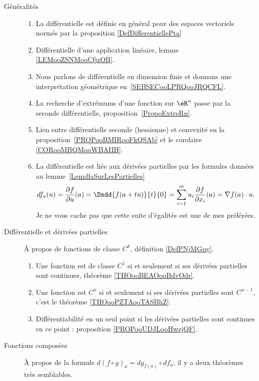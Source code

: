 \begin{description}
	\item[Généralités]
		\begin{enumerate}
			\item
			      La différentielle est définie en général pour des espaces vectoriels normés par la proposition \ref{DefDifferentiellePta}
			\item
			      Différentielle d'une application linéaire, lemme \ref{LEMooZSNMooCfjzOB}.
			\item
			      Nous parlons de différentielle en dimension finie et donnons une interprétation géométrique en~\ref{SEBSECooLPRQooJRQCFL}.
			\item
			      La recherche d'extrémums d'une fonction sur \( \eR^n\) passe par la seconde différentielle, proposition~\ref{PropoExtreRn}.
			\item
			      Lien entre différentielle seconde (hessienne) et convexité en la proposition~\ref{PROPooBMIRooFkQSAb} et le corolaire \ref{CORooMBQMooWBAIIH}.
			\item
			      La différentielle est liée aux dérivées partielles par les formules données au lemme~\ref{LemdfaSurLesPartielles}
			      \begin{equation}
				      df_a(u)=\frac{ \partial f }{ \partial u }(a)=\Dsdd{ f(a+tu) }{t}{0}=\sum_{i=1}^mu_i\frac{ \partial f }{ \partial x_i }(a)=\nabla f(a)\cdot u.
			      \end{equation}
			      Je ne vous cache pas que cette suite d'égalités est une de mes préférées.
		\end{enumerate}
	\item[Différentielle et dérivées partielles]
		À propos de fonctions de classe \( C^k\), définition \ref{DefPNjMGqy}.
		\begin{enumerate}
			\item
			      Une fonction est de classe \( C^1\) si et seulement si ses dérivées partielles sont continues, théorème \ref{THOooBEAOooBdvOdr}.
			\item
			      Une fonction est \( C^n\) si et seulement si ses dérivées partielles sont \( C^{n-1}\), c'est le théorème \ref{THOooPZTAooTASBhZ}.
			\item
			      Différentiabilité en un seul point si les dérivées partielles sont continues en ce point : proposition \ref{PROPooUDJLooHwzjQF}.
		\end{enumerate}
	\item[Fonctions composées]
		À propos de la formule \( d(f\circ g)_a=dg_{f(a)}\circ df_a\), il y a deux théorèmes très semblables.

\end{description}
